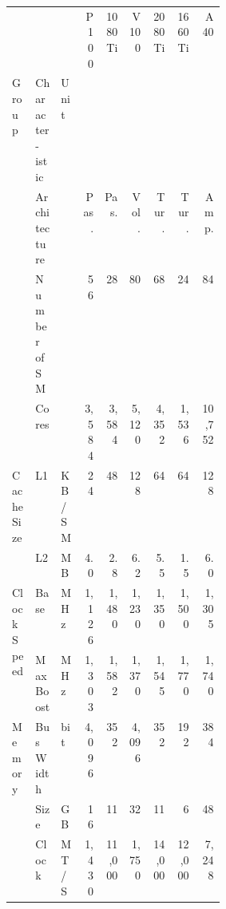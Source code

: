 \begin{tabular}{p{0.11\linewidth}p{0.12\linewidth}p{0.082\linewidth}|rrrrrr}
    \toprule
                                                  &                          &               & P100  & 1080Ti & V100   & 2080Ti & 1660Ti & A40    \\
    Group                                         & Character-\newline istic & Unit          &       &        &        &        &        &        \\
    \midrule\midrule
    \multirow[t]{3}{\linewidth}{}                 & Architecture             &               & Pas.  & Pas.   & Vol.   & Tur.   & Tur.   & Amp.   \\
    \cline{2-9}
                                                  & Number of SM             &               & 56    & 28     & 80     & 68     & 24     & 84     \\
    \cline{2-9}
                                                  & Cores                    &               & 3,584 & 3,584  & 5,120  & 4,352  & 1,536  & 10,752 \\
    \cline{1-9} \cline{2-9}
    \multirow[t]{2}{\linewidth}{Cache Size}       & L1                       & KB/SM         & 24    & 48     & 128    & 64     & 64     & 128    \\
    \cline{2-9}
                                                  & L2                       & MB            & 4.0   & 2.8    & 6.2    & 5.5    & 1.5    & 6.0    \\
    \cline{1-9} \cline{2-9}
    \multirow[t]{2}{\linewidth}{Clock Speed}      & Base                     & MHz           & 1,126 & 1,480  & 1,230  & 1,350  & 1,500  & 1,305  \\
    \cline{2-9}
                                                  & Max Boost                & MHz           & 1,303 & 1,582  & 1,370  & 1,545  & 1,770  & 1,740  \\
    \cline{1-9} \cline{2-9}
    \multirow[t]{4}{\linewidth}{Memory}           & Bus Width                & bit           & 4,096 & 352    & 4,096  & 352    & 192    & 384    \\
    \cline{2-9}
                                                  & Size                     & GB            & 16    & 11     & 32     & 11     & 6      & 48     \\
    \cline{2-9}
                                                  & Clock                    & MT/S          & 1,430 & 11,000 & 1,750  & 14,000 & 12,000 & 7,248  \\

\end{tabular}

